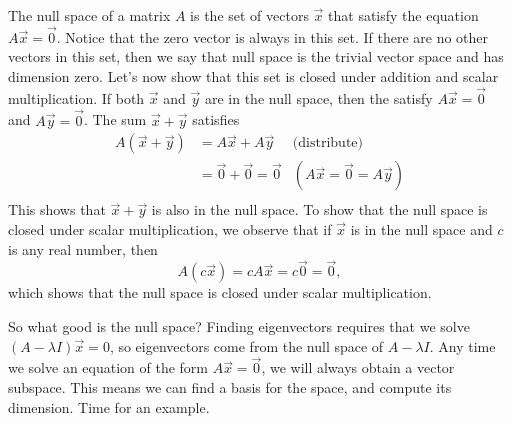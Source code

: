 The null space of a matrix $A$ is the set of vectors $\vec x$ that satisfy the equation $A\vec x=\vec 0$. Notice that the zero vector is always in this set. If there are no other vectors in this set, then we say that null space is the trivial vector space and has dimension zero.  Let's now show that this set is closed under addition and scalar multiplication.  If both $\vec x$ and $\vec y$ are in the null space, then the satisfy $A\vec x=\vec 0$ and $A\vec y=\vec 0$. The sum $\vec x+\vec y$ satisfies 
\begin{align*}
A(\vec x+\vec y)
&= A\vec x+A\vec y &\text{(distribute)}\\
&= \vec 0 +\vec 0 = \vec 0 &(A\vec x = \vec 0 =A\vec y)\\
\end{align*}
This shows that $\vec x+\vec y$ is also in the null space.  
To show that the null space is closed under scalar multiplication, we observe that if $\vec x$ is in the null space and $c$ is any real number, then $$A(c\vec x) = cA\vec x = c\vec 0 = \vec 0,$$
which shows that the null space is closed under scalar multiplication.

So what good is the null space? Finding eigenvectors requires that we solve $(A-\lambda I)\vec x = 0$, so eigenvectors come from the null space of $A-\lambda I$.  Any time we solve an equation of the form $A\vec x = \vec 0$, we will always obtain a vector subspace.  This means we can find a basis for the space, and compute its dimension.  Time for an example.

